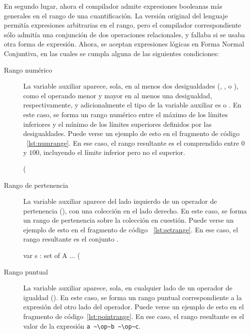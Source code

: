 En segundo lugar, ahora el compilador admite expresiones booleanas más generales
en el rango de una cuantificación. La versión original del lenguaje permitía
expresiones arbitrarias en el rango, pero el compilador correspondiente sólo
admitía una conjunción de dos operaciones relacionales, y fallaba si se usaba
otra forma de expresión. Ahora, se aceptan expresiones lógicas en Forma Normal
Conjuntiva, en las cuales se cumpla alguna de las siguientes condiciones:

\begin{description}%

  \item [Rango numérico] La variable auxiliar aparece, sola, en al menos dos
  desigualdades (\ingra{<}, \ingra{<=}, \ingra{>} o \ingra{>=}), como el
  operando menor y mayor en al menos una desigualdad, respectivamente, y
  adicionalmente el tipo de la variable auxiliar es  o .
  En este caso, se forma un rango numérico entre el máximo de los límites
  inferiores y el mínimo de los límites superiores definidos por las
  desigualdades. Puede verse un ejemplo de esto en el fragmento de código
 ~\ref{lst:numrange}. En ese caso, el rango resultante es el comprendido entre $0$ y $100$,
  incluyendo  el límite inferior pero no el superior.

\begin{gracielacode}[caption=Cuantificación con rango numérico, label=lst:numrange]
(%
\end{gracielacode}

  \item [Rango de pertenencia] La variable auxiliar aparece del lado izquierdo
  de un operador de pertenencia (\Elem), con una colección en el lado derecho.
  En este caso, se forma un rango de pertenencia sobre la colección en
  cuestión. Puede verse un ejemplo de esto en el fragmento de código
 ~\ref{lst:setrange}.  En ese caso, el rango resultante es el conjunto .

\begin{gracielacode}[caption=Cuantificación con rango de pertenencia, label=lst:setrange]
var s : set of A
...
(%
\end{gracielacode}

  \item [Rango puntual] La variable auxiliar aparece, sola, en cualquier lado de
  un operador de igualdad (\ingra{==}). En este caso, se forma un rango puntual
  correspondiente a la expresión del otro lado del operador. Puede verse un
  ejemplo de esto en el fragmento de código~\ref{lst:pointrange}. En ese caso,
  el rango resultante es el valor de la expresión
  \lstinline[language=graciela]{a ~\op~b ~\op~c}.


\end{description}
